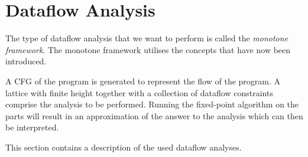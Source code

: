 \section{Dataflow Analysis}
The type of dataflow analysis that we want to perform is called the \emph{monotone framework}.
The monotone framework utilises the concepts that have now been introduced.

A CFG of the program is generated to represent the flow of the program.
A lattice with finite height together with a collection of dataflow constraints comprise the analysis to be performed.
Running the fixed-point algorithm on the parts will result in an approximation of the answer to the analysis which can then be interpreted.

This section contains a description of the used dataflow analyses. 

